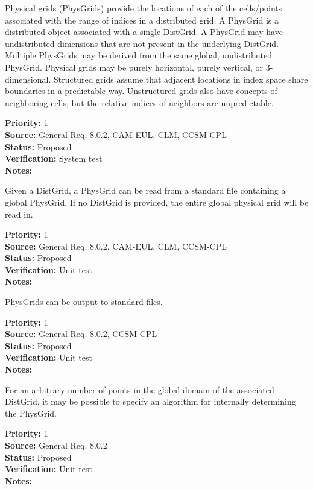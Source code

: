 
Physical grids (PhysGrids) provide the locations of each of the cells/points
associated with the range of indices in a distributed grid.  A PhysGrid is a
distributed object associated with a single DistGrid.  A PhysGrid may have
undistributed dimensions that are not present in the underlying DistGrid. 
Multiple PhysGrids may be derived from the same global, undistributed PhysGrid. 
Physical grids may be purely horizontal, purely vertical, or 3-dimensional. 
Structured grids assume that adjacent locations in index space share boundaries
in a predictable way.  Unstructured grids also have concepts of neighboring
cells, but the relative indices of neighbors are unpredictable.

\begin{reqlist}
{\bf Priority:} 1 \\
{\bf Source:} General Req. 8.0.2, CAM-EUL, CLM, CCSM-CPL \\
{\bf Status:} Proposed \\
{\bf Verification:} System test\\
{\bf Notes:}
\end{reqlist}

Given a DistGrid, a PhysGrid can be read from a standard file containing a
global PhysGrid. If no DistGrid is provided, the entire global physical grid will
be read in.
\begin{reqlist}
{\bf Priority:} 1 \\
{\bf Source:} General Req. 8.0.2, CAM-EUL, CLM, CCSM-CPL \\
{\bf Status:} Proposed \\
{\bf Verification:} Unit test\\
{\bf Notes:} 
\end{reqlist}

PhysGrids can be output to standard files.
\begin{reqlist}
{\bf Priority:} 1 \\
{\bf Source:} General Req. 8.0.2, CCSM-CPL \\
{\bf Status:} Proposed \\
{\bf Verification:} Unit test\\
{\bf Notes:} 
\end{reqlist}

For an arbitrary number of points in the global domain of the associated
DistGrid, it may be possible to specify an algorithm for internally
determining the PhysGrid.
\begin{reqlist}
{\bf Priority:} 1 \\
{\bf Source:} General Req. 8.0.2 \\
{\bf Status:} Proposed \\
{\bf Verification:} Unit test\\
{\bf Notes:} 
\end{reqlist}

